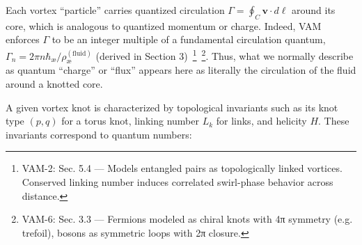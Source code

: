 \documentclass[a4paper,12pt]{article}
\begin{document}
    Each vortex “particle” carries quantized circulation $\Gamma = \oint_C \mathbf{v}\cdot d\boldsymbol{\ell}$ around its core, which is analogous to quantized momentum or charge. Indeed, VAM enforces $\Gamma$ to be an integer multiple of a fundamental circulation quantum, $\Gamma_n = 2\pi n \hbar_{\text{\ae}}/\rho_{\text{\ae}}^{(\text{fluid})}$ (derived in Section 3)~\footnote{VAM-2: Sec. 5.4 — Models entangled pairs as topologically linked vortices. Conserved linking number induces correlated swirl-phase behavior across distance.}~\footnote{VAM-6: Sec. 3.3 — Fermions modeled as chiral knots with 4π symmetry (e.g. trefoil), bosons as symmetric loops with 2π closure.}. Thus, what we normally describe as quantum “charge” or “flux” appears here as literally the circulation of the fluid around a knotted core.

    A given vortex knot is characterized by topological invariants such as its knot type $(p,q)$ for a torus knot, linking number $L_k$ for links, and helicity $H$. These invariants correspond to quantum numbers:
\end{document}
